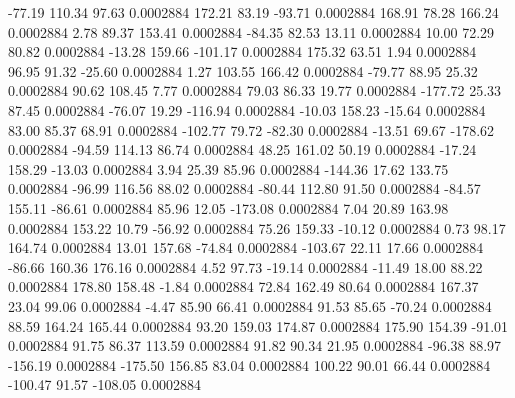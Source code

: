       -77.19      110.34       97.63     0.0002884
      172.21       83.19      -93.71     0.0002884
      168.91       78.28      166.24     0.0002884
        2.78       89.37      153.41     0.0002884
      -84.35       82.53       13.11     0.0002884
       10.00       72.29       80.82     0.0002884
      -13.28      159.66     -101.17     0.0002884
      175.32       63.51        1.94     0.0002884
       96.95       91.32      -25.60     0.0002884
        1.27      103.55      166.42     0.0002884
      -79.77       88.95       25.32     0.0002884
       90.62      108.45        7.77     0.0002884
       79.03       86.33       19.77     0.0002884
     -177.72       25.33       87.45     0.0002884
      -76.07       19.29     -116.94     0.0002884
      -10.03      158.23      -15.64     0.0002884
       83.00       85.37       68.91     0.0002884
     -102.77       79.72      -82.30     0.0002884
      -13.51       69.67     -178.62     0.0002884
      -94.59      114.13       86.74     0.0002884
       48.25      161.02       50.19     0.0002884
      -17.24      158.29      -13.03     0.0002884
        3.94       25.39       85.96     0.0002884
     -144.36       17.62      133.75     0.0002884
      -96.99      116.56       88.02     0.0002884
      -80.44      112.80       91.50     0.0002884
      -84.57      155.11      -86.61     0.0002884
       85.96       12.05     -173.08     0.0002884
        7.04       20.89      163.98     0.0002884
      153.22       10.79      -56.92     0.0002884
       75.26      159.33      -10.12     0.0002884
        0.73       98.17      164.74     0.0002884
       13.01      157.68      -74.84     0.0002884
     -103.67       22.11       17.66     0.0002884
      -86.66      160.36      176.16     0.0002884
        4.52       97.73      -19.14     0.0002884
      -11.49       18.00       88.22     0.0002884
      178.80      158.48       -1.84     0.0002884
       72.84      162.49       80.64     0.0002884
      167.37       23.04       99.06     0.0002884
       -4.47       85.90       66.41     0.0002884
       91.53       85.65      -70.24     0.0002884
       88.59      164.24      165.44     0.0002884
       93.20      159.03      174.87     0.0002884
      175.90      154.39      -91.01     0.0002884
       91.75       86.37      113.59     0.0002884
       91.82       90.34       21.95     0.0002884
      -96.38       88.97     -156.19     0.0002884
     -175.50      156.85       83.04     0.0002884
      100.22       90.01       66.44     0.0002884
     -100.47       91.57     -108.05     0.0002884
